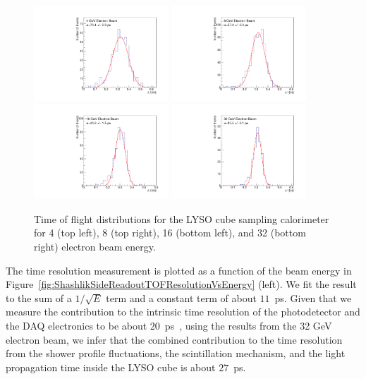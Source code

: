 \begin{figure}[H] \centering
\includegraphics[width=0.45\textwidth]{figs/timing/TOF_Electron_LYSOCube_4GeV} 
\includegraphics[width=0.45\textwidth]{figs/timing/TOF_Electron_LYSOCube_8GeV} \\
\includegraphics[width=0.45\textwidth]{figs/timing/TOF_Electron_LYSOCube_16GeV} 
\includegraphics[width=0.45\textwidth]{figs/timing/TOF_Electron_LYSOCube_32GeV} 
\caption{  Time of flight distributions for the LYSO cube sampling calorimeter
for 4 \GeV (top left), 8 \GeV (top right), 16 \GeV (bottom left), and 32 \GeV (bottom right) electron beam energy. } 
\label{fig:LYSOCubeTOF}
\end{figure}

The time resolution measurement is plotted as a function of the
beam energy in Figure~\ref{fig:ShashlikSideReadoutTOFResolutionVsEnergy} (left). We fit the result to the sum of a 
$1/\sqrt{E}$ term and a constant term of about $11$~\unit{ps}.   Given that we measure the contribution 
to the intrinsic time resolution of the photodetector and the DAQ electronics to be about 
$20$~\unit{ps}~\cite{MCPFastCaloNIMA}, using the results from the 32 GeV electron beam, we infer 
that the combined contribution to the time resolution from the shower profile
fluctuations, the scintillation mechanism, and the light propagation time inside the
LYSO cube is about $27$~\unit{ps}.  

